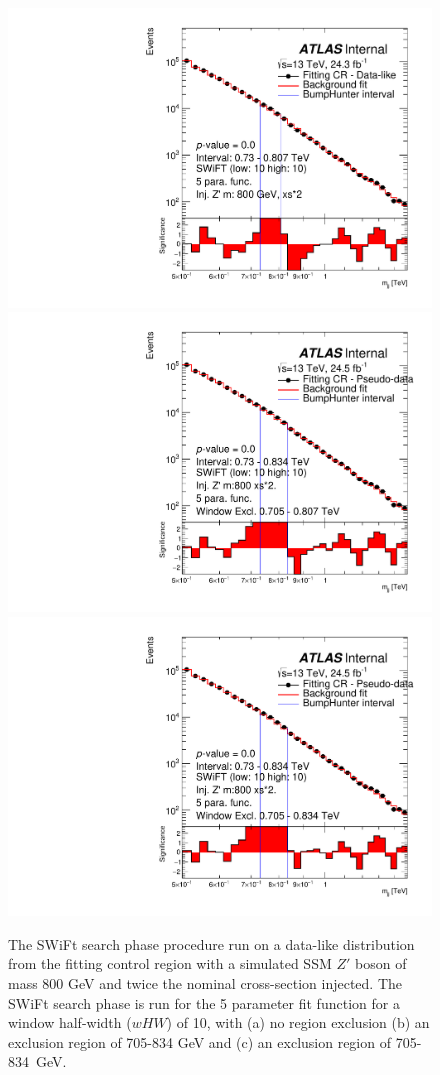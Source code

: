 \begin{figure}[!htb]
\captionsetup[subfigure]{aboveskip=0pt,justification=centering}
\centering
{} {
  \includegraphics[width=0.45\linewidth, angle=0]{figs/Dibjet/LowMass/FitStudy/bhFit_corrFitCR_dataLike_5para_low10_high10_inj_Zprimebb800_xsFactor2.pdf}
}
 {
  \includegraphics[width=0.45\linewidth, angle=0]{figs/Dibjet/LowMass/FitStudy/bhFit_corrFitCR_dataLike_5para_low10_high10_inj_Zprimebb800_xsFactor2_removedWindow.pdf}
}\\
 {
  \includegraphics[width=0.45\linewidth, angle=0]{figs/Dibjet/LowMass/FitStudy/bhFit_corrFitCR_dataLike_5para_low10_high10_inj_Zprimebb800_xsFactor2_removedWindow2.pdf}
}
\vspace{10pt}
\caption{\label{fig:bhFit_lm_corrFitCR_dataLike_inj_Zprimebb800_xsFactor2_wHW10}
  The SWiFt search phase procedure run on a data-like distribution
  from the fitting control region with a simulated SSM $Z'$ boson of mass 800 GeV and twice the nominal cross-section injected.
  The SWiFt search phase is run for the 5 parameter fit function for a window half-width ($wHW$) of 10,
  with (a) no region exclusion (b) an exclusion region of 705-834 GeV and (c) an exclusion region of 705-834~GeV.}
\end{figure}

